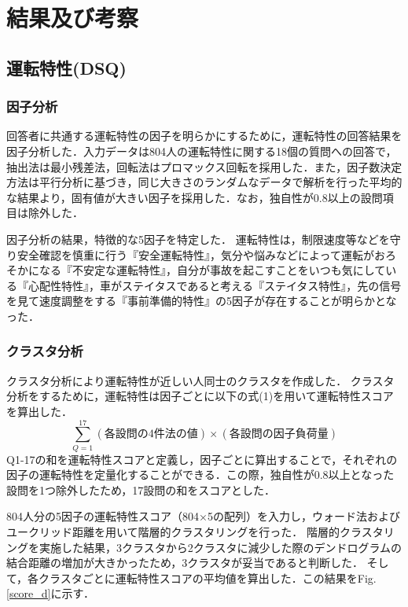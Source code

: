 \documentclass[twocolumn,a4j]{jarticle}
\begin{document}
\section{結果及び考察}
\subsection{運転特性(DSQ)}
\label{dsq_l}
\subsubsection{因子分析}
\label{fac}
回答者に共通する運転特性の因子を明らかにするために，運転特性の回答結果を因子分析した．入力データは804人の運転特性に関する18個の質問への回答で，抽出法は最小残差法，回転法はプロマックス回転を採用した．また，因子数決定方法は平行分析に基づき，同じ大きさのランダムなデータで解析を行った平均的な結果より，固有値が大きい因子を採用した．なお，独自性が0.8以上の設問項目は除外した．

因子分析の結果，特徴的な5因子を特定した．
運転特性は，制限速度等などを守り安全確認を慎重に行う『安全運転特性』，気分や悩みなどによって運転がおろそかになる『不安定な運転特性』，自分が事故を起こすことをいつも気にしている『心配性特性』，車がステイタスであると考える『ステイタス特性』，先の信号を見て速度調整をする『事前準備的特性』の5因子が存在することが明らかとなった．

\vspace{\baselineskip}
\subsubsection{クラスタ分析}
\label{clu}
クラスタ分析により運転特性が近しい人同士のクラスタを作成した．
クラスタ分析をするために，運転特性は因子ごとに以下の式(1)を用いて運転特性スコアを算出した．
\begin{equation}
\sum_{Q=1}^{17} (\text{各設問の4件法の値}) \times (\text{各設問の因子負荷量}) \label{eq}
\end{equation}
Q1-17の和を運転特性スコアと定義し，因子ごとに算出することで，それぞれの因子の運転特性を定量化することができる．この際，独自性が0.8以上となった設問を1つ除外したため，17設問の和をスコアとした．

804人分の5因子の運転特性スコア（804×5の配列）を入力し，ウォード法およびユークリッド距離を用いて階層的クラスタリングを行った．
階層的クラスタリングを実施した結果，3クラスタから2クラスタに減少した際のデンドログラムの結合距離の増加が大きかったため，3クラスタが妥当であると判断した．
そして，各クラスタごとに運転特性スコアの平均値を算出した．この結果をFig.\ref{score_d}に示す．
\end{document}
